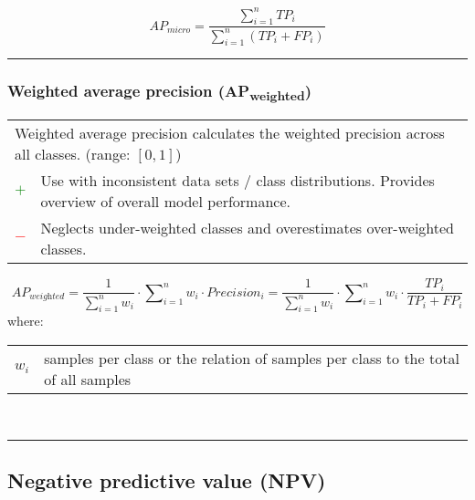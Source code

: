 \documentclass{article}
\makeatletter
\newenvironment{conditions}[1][where:]
	{\hspace{0.02\textwidth} #1 \begin{tabular}[t]{>{$}l<{$} @{${}={}$} l}}
	{\end{tabular}\\[\belowdisplayskip]}
\makeatother
\begin{document}
\begin{equation}
	\textit{AP}_\textit{micro} = \dfrac{\sum\nolimits_{i = 1}^n \textit{TP}_i}{\sum\nolimits_{i = 1}^n (\textit{TP}_i + \textit{FP}_i)}
%
	\label{equation:MIAP}
\end{equation}

\hrule


\subsubsection[Weighted average precision (APweighted)]{Weighted average precision (AP\textsubscript{weighted}) \cite{han2014rule}}

\begin{table}[H]\centering
	\begin{tabular}{m{}m{}}
		\multicolumn{2}{m{0.95\textwidth}}{Weighted average precision calculates the weighted precision across all classes. (range: $[0, 1]$)} \\
		\textcolor{Green}{$+$} & Use with inconsistent data sets / class distributions. Provides overview of overall model performance. \\
		\textcolor{Red}{$-$}   & Neglects under-weighted classes and overestimates over-weighted classes.
	\end{tabular}
\end{table}

\begin{equation}
	\textit{AP}_\textit{weighted} = \dfrac{1}{\sum\nolimits_{i = 1}^n w_i} \cdot \sum\nolimits_{i = 1}^n w_i \cdot \textit{Precision}_i = \dfrac{1}{\sum\nolimits_{i = 1}^n w_i} \cdot \sum\nolimits_{i = 1}^n w_i \cdot \dfrac{\textit{TP}_i}{\textit{TP}_i + \textit{FP}_i}
%
	\label{equation:WAP}
\end{equation}
%
\begin{conditions}
	w_i & samples per class or the relation of samples per class to the total of all samples
\end{conditions}

\hrule


\subsection[Negative predictive value (NPV)]{Negative predictive value (NPV) \cite{altman1994statistics, fletcher2019clinical}}
\end{document}
